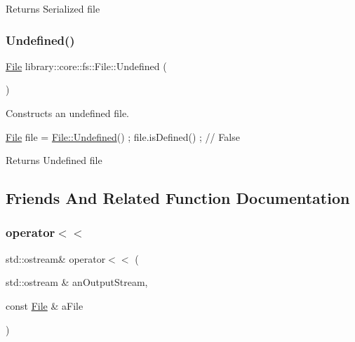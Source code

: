 \begin{DoxyReturn}{Returns}
Serialized file 
\end{DoxyReturn}
\mbox{\label{classlibrary_1_1core_1_1fs_1_1_file_af45fa5c36c359a979149845ef06586e6}} 
\subsubsection{\texorpdfstring{Undefined()}{Undefined()}}
{\footnotesize\ttfamily \hyperlink{classlibrary_1_1core_1_1fs_1_1_file}{File} library\+::core\+::fs\+::\+File\+::\+Undefined (\begin{DoxyParamCaption}{ }\end{DoxyParamCaption})\hspace{0.3cm}{\ttfamily [static]}}



Constructs an undefined file. 


\begin{DoxyCode}
\hyperlink{classlibrary_1_1core_1_1fs_1_1_file_a6f3f0d79545ac9984c6f49432f0c6c39}{File} file = \hyperlink{classlibrary_1_1core_1_1fs_1_1_file_af45fa5c36c359a979149845ef06586e6}{File::Undefined}() ;
file.isDefined() ; \textcolor{comment}{// False}
\end{DoxyCode}


\begin{DoxyReturn}{Returns}
Undefined file 
\end{DoxyReturn}


\subsection{Friends And Related Function Documentation}
\mbox{\label{classlibrary_1_1core_1_1fs_1_1_file_a82ce9f27653427d53ecb90de978f4f68}} 
\subsubsection{\texorpdfstring{operator$<$$<$}{operator<<}}
{\footnotesize\ttfamily std\+::ostream\& operator$<$$<$ (\begin{DoxyParamCaption}\item[{std\+::ostream \&}]{an\+Output\+Stream,  }\item[{const \hyperlink{classlibrary_1_1core_1_1fs_1_1_file}{File} \&}]{a\+File }\end{DoxyParamCaption})\hspace{0.3cm}{\ttfamily [friend]}}



